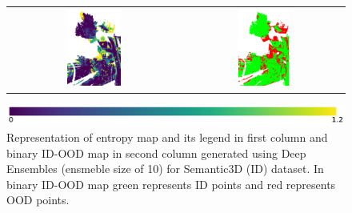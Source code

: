 \begin{figure}[h!]
\begin{tabular}{cc}
            \includegraphics[width=0.33\textwidth, height=0.18\textheight]{images/ood_imgs/de_sem3d/de_ent_10_3.pdf}& 
            \includegraphics[width=0.33\textwidth, height=0.18\textheight]{images/ood_imgs/de_sem3d/de_ent_ood_auroc_3.pdf}\\
        \end{tabular}
        \includegraphics[scale=0.45]{images/ent_legend.pdf}
        \caption{Representation of entropy map and its legend in first column and binary ID-OOD map in second column generated using Deep Ensembles (ensmeble size of 10) for Semantic3D (ID) dataset. In binary ID-OOD map green represents ID points and red represents OOD points.}
        \label{fig:de_ood_auroc_sem3d_ent}
    \end{figure}
